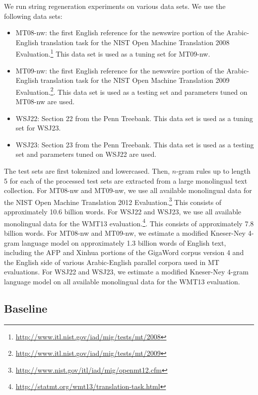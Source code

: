 We run string regeneration experiments on various
data sets. We use the following data sets:
%
\begin{itemize}
  \item MT08-nw: the first English reference for the newswire portion of the
    Arabic-English translation task for the NIST Open Machine Translation 2008
    Evaluation.\footnote{\url{http://www.itl.nist.gov/iad/mig/tests/mt/2008}}
    This data set is used as a tuning set for MT09-nw.
  \item MT09-nw: the first English reference for the newswire portion of the
    Arabic-English translation task for the NIST Open Machine Translation 2009
    Evaluation.\footnote{\url{http://www.itl.nist.gov/iad/mig/tests/mt/2009}}.
    This data set is used as a testing set and parameters tuned on MT08-nw are used.
  \item WSJ22: Section 22 from the Penn Treebank. This data set is used
    as a tuning set for WSJ23.
  \item WSJ23: Section 23 from the Penn Treebank. This data set is used as a
    testing set and parameters tuned on WSJ22 are used.
\end{itemize}
%
The test sets are first tokenized and lowercased.
Then, $n$-gram rules up to length 5 for each of the processed test sets
are extracted from a large monolingual text collection.
For MT08-nw and MT09-nw, we use all available monolingual data
for the NIST Open Machine Translation 2012
Evaluation.\footnote{\url{http://www.nist.gov/itl/iad/mig/openmt12.cfm}}
This consists of approximately 10.6 billion words.
For WSJ22 and WSJ23, we use all available monolingual data for the WMT13
evaluation.\footnote{\url{http://statmt.org/wmt13/translation-task.html}}.
This consists of approximately 7.8 billion words.
For MT08-nw and MT09-nw, we estimate a modified Kneser-Ney 4-gram language model
on approximately 1.3 billion words of English text, including
the AFP and Xinhua portions of the GigaWord corpus
version 4 and the English side of various Arabic-English
parallel corpora used in MT evaluations. For WSJ22 and WSJ23, we
estimate a modified Kneser-Ney 4-gram language model on all available
monolingual data for the WMT13 evaluation.

\subsection{Baseline}
\label{sec:gyroBaseline}

